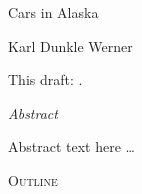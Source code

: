 \documentclass[11pt,letterpaper,oneside]{article}
\begin{document}
\thispagestyle{empty}
\setcounter{page}{0}
\vspace*{0.7in plus 0.3in minus 0.3in}

\begin{center}
    \textsf{\LARGE Cars in Alaska}

    \textsf{\Large Karl Dunkle Werner}

    \textsf{This draft:
    \href{https://github.com/karldw/second_year_paper/blob/\gitHash/Text/cars_in_alaska.pdf}{\gitCommitterDate{}}.}
\end{center}

\vspace{2in plus 1in minus 0.7in}

\begin{center}
    \begin{minipage}{0.7\linewidth}
        \begin{center}
            \textit{Abstract}
        \end{center}
        Abstract text here \ldots
    \end{minipage}
\end{center}

\pagebreak

\textsc{\Large Outline}
\end{document}
